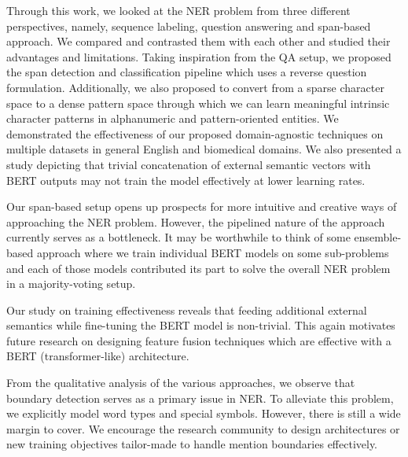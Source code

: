 Through this work, we looked at the NER problem from three different perspectives, namely, sequence labeling, question answering and span-based approach. We compared and contrasted them with each other and studied their advantages and limitations. Taking inspiration from the QA setup, we proposed the span detection and classification pipeline which uses a reverse question formulation. Additionally, we also proposed to convert from a sparse character space to a dense pattern space through which we can learn meaningful intrinsic character patterns in alphanumeric and pattern-oriented entities. We demonstrated the effectiveness of our proposed domain-agnostic techniques on multiple datasets in general English and biomedical domains. We also presented a study depicting that trivial concatenation of external semantic vectors with BERT outputs may not train the model effectively at lower learning rates.

Our span-based setup opens up prospects for more intuitive and creative ways of approaching the NER problem. However, the pipelined nature of the approach currently serves as a bottleneck. It may be worthwhile to think of some ensemble-based approach where we train individual BERT models on some sub-problems and each of those models contributed its part to solve the overall NER problem in a majority-voting setup.

Our study on training effectiveness reveals that feeding additional external semantics while fine-tuning the BERT model is non-trivial. This again motivates future research on designing feature fusion techniques which are effective with a BERT (transformer-like) architecture.

From the qualitative analysis of the various approaches, we observe that boundary detection serves as a primary issue in NER. To alleviate this problem, we explicitly model word types and special symbols. However, there is still a wide margin to cover. We encourage the research community to design architectures or new training objectives tailor-made to handle mention boundaries effectively. 